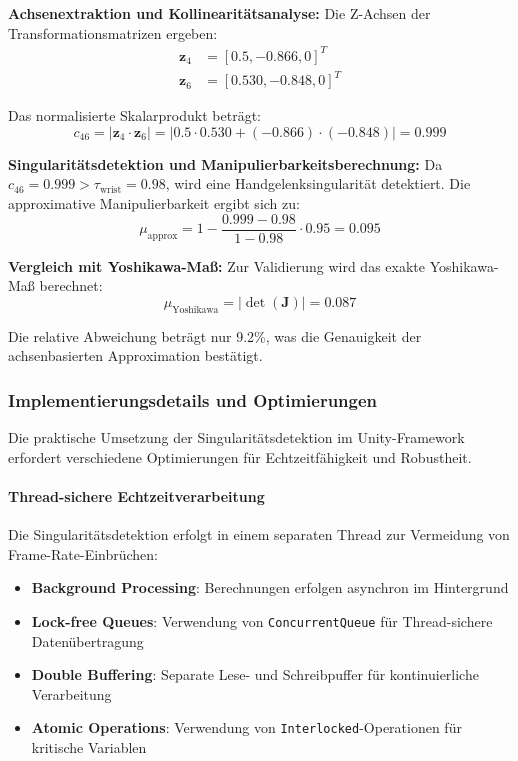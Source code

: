 \textbf{Achsenextraktion und Kollinearitätsanalyse:}
Die Z-Achsen der Transformationsmatrizen ergeben:
\begin{align}
    \mathbf{z}_4 & = [0.5, -0.866, 0]^T   \\
    \mathbf{z}_6 & = [0.530, -0.848, 0]^T
\end{align}

Das normalisierte Skalarprodukt beträgt:
\begin{equation}
    c_{46} = |\mathbf{z}_4 \cdot \mathbf{z}_6| = |0.5 \cdot 0.530 + (-0.866) \cdot (-0.848)| = 0.999
\end{equation}

\textbf{Singularitätsdetektion und Manipulierbarkeitsberechnung:}
Da $c_{46} = 0.999 > \tau_{\text{wrist}} = 0.98$, wird eine Handgelenksingularität detektiert. Die approximative Manipulierbarkeit ergibt sich zu:
\begin{equation}
    \mu_{\text{approx}} = 1 - \frac{0.999 - 0.98}{1 - 0.98} \cdot 0.95 = 0.095
\end{equation}

\textbf{Vergleich mit Yoshikawa-Maß:}
Zur Validierung wird das exakte Yoshikawa-Maß berechnet:
\begin{equation}
    \mu_{\text{Yoshikawa}} = |\det(\mathbf{J})| = 0.087
\end{equation}

Die relative Abweichung beträgt nur 9.2\%, was die Genauigkeit der
achsenbasierten Approximation bestätigt.

\subsubsection{Implementierungsdetails und Optimierungen}
\label{sssec:Implementierungsdetails}

Die praktische Umsetzung der Singularitätsdetektion im Unity-Framework
erfordert verschiedene Optimierungen für Echtzeitfähigkeit und Robustheit.

\paragraph{Thread-sichere Echtzeitverarbeitung}
Die Singularitätsdetektion erfolgt in einem separaten Thread zur Vermeidung von
Frame-Rate-Einbrüchen:

\begin{itemize}
    \item \textbf{Background Processing}: Berechnungen erfolgen asynchron im Hintergrund
    \item \textbf{Lock-free Queues}: Verwendung von \texttt{ConcurrentQueue} für Thread-sichere Datenübertragung
    \item \textbf{Double Buffering}: Separate Lese- und Schreibpuffer für kontinuierliche Verarbeitung
    \item \textbf{Atomic Operations}: Verwendung von \texttt{Interlocked}-Operationen für kritische Variablen
\end{itemize}

